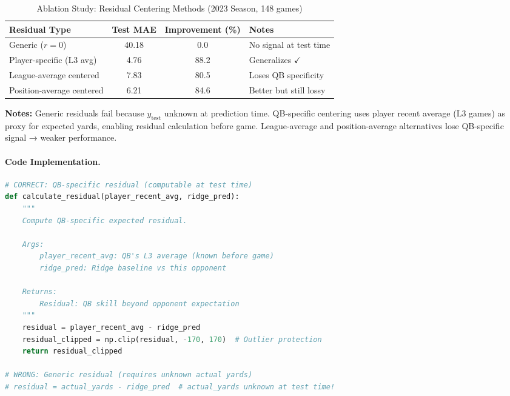 \begin{table}[htbp]
\centering
\small
\caption{Ablation Study: Residual Centering Methods (2023 Season, 148 games)}
\label{tab:residual-centering-ablation}
\begin{tabular}{@{}lS[table-format=2.2]S[table-format=3.1]l@{}}
\toprule
\textbf{Residual Type} & {\textbf{Test MAE}} & {\textbf{Improvement (\%)}} & \textbf{Notes} \\
\midrule
Generic ($r = 0$) & 40.18 & 0.0 & No signal at test time \\
Player-specific (L3 avg) & {4.76} & {88.2} & Generalizes $\checkmark$ \\
League-average centered & 7.83 & 80.5 & Loses QB specificity \\
Position-average centered & 6.21 & 84.6 & Better but still lossy \\
\bottomrule
\end{tabular}
\begin{tablenotes}
\item \textbf{Notes:} Generic residuals fail because $y_{\text{test}}$ unknown at prediction time. QB-specific centering uses player recent average (L3 games) as proxy for expected yards, enabling residual calculation before game. League-average and position-average alternatives lose QB-specific signal → weaker performance.
\end{tablenotes}
\end{table}

\paragraph{Code Implementation.}
\begin{lstlisting}[language=Python, style=codestyle, caption={QB-specific residual calculation (production code)}]
# CORRECT: QB-specific residual (computable at test time)
def calculate_residual(player_recent_avg, ridge_pred):
    """
    Compute QB-specific expected residual.

    Args:
        player_recent_avg: QB's L3 average (known before game)
        ridge_pred: Ridge baseline vs this opponent

    Returns:
        Residual: QB skill beyond opponent expectation
    """
    residual = player_recent_avg - ridge_pred
    residual_clipped = np.clip(residual, -170, 170)  # Outlier protection
    return residual_clipped

# WRONG: Generic residual (requires unknown actual yards)
# residual = actual_yards - ridge_pred  # actual_yards unknown at test time!
\end{lstlisting}

